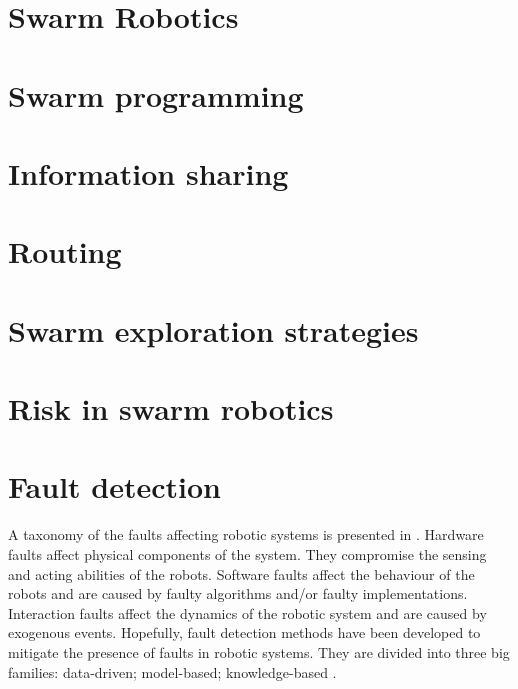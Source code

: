\label{sec:RevLitt}


\section{Swarm Robotics}

\section{Swarm programming}

\section{Information sharing}

\section{Routing}

\section{Swarm exploration strategies}

\section{Risk in swarm robotics}

\section{Fault detection}

A taxonomy of the faults affecting robotic systems is presented in \cite{khalastchi2018fault}. Hardware faults affect physical components of the system. They compromise the sensing and acting abilities of the robots. Software faults affect the behaviour of the robots and are caused by faulty algorithms and/or faulty implementations. Interaction faults affect the dynamics of the robotic system and are caused by exogenous events. Hopefully, fault detection methods have been developed to mitigate the presence of faults in robotic systems. They are divided into three big families: data-driven; model-based; knowledge-based \cite{khalastchi2018fault}. 

